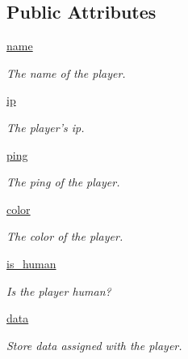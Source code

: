 \subsection*{Public Attributes}
\begin{DoxyCompactItemize}
\item 
\hyperlink{class_player_1_1_player_a6cea7416f6b4ce563211f3194033f671}{name}
\begin{DoxyCompactList}\small\item\em The name of the player. \item\end{DoxyCompactList}\item 
\hyperlink{class_player_1_1_player_a48ed10bfc12677f9c41e2cae6daafa49}{ip}
\begin{DoxyCompactList}\small\item\em The player's ip. \item\end{DoxyCompactList}\item 
\hyperlink{class_player_1_1_player_ab675ec89c8e17a56d85f0304f46465ea}{ping}
\begin{DoxyCompactList}\small\item\em The ping of the player. \item\end{DoxyCompactList}\item 
\hyperlink{class_player_1_1_player_a323d688193f511184787b2e598222e74}{color}
\begin{DoxyCompactList}\small\item\em The color of the player. \item\end{DoxyCompactList}\item 
\hyperlink{class_player_1_1_player_a01b505c0fe5ff3d20d75327800b1552e}{is\_\-human}
\begin{DoxyCompactList}\small\item\em Is the player human? \item\end{DoxyCompactList}\item 
\hyperlink{class_player_1_1_player_a1a50d6ee0682ff86b83ea314dfa58ce6}{data}
\begin{DoxyCompactList}\small\item\em Store data assigned with the player. \item\end{DoxyCompactList}\end{DoxyCompactItemize}
